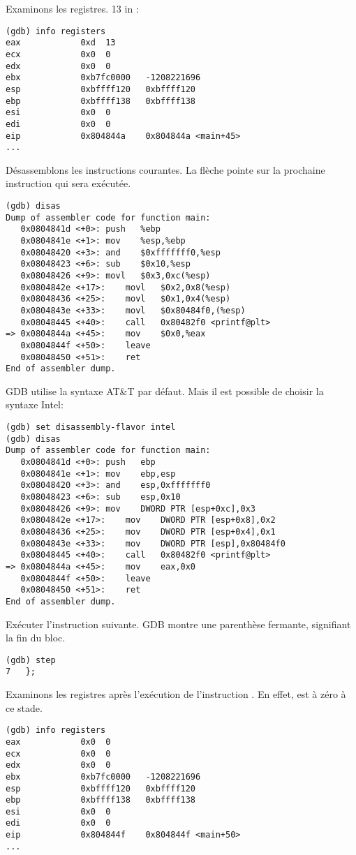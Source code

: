 Examinons les registres.
13 in \EAX:

\begin{lstlisting}
(gdb) info registers
eax            0xd	13
ecx            0x0	0
edx            0x0	0
ebx            0xb7fc0000	-1208221696
esp            0xbffff120	0xbffff120
ebp            0xbffff138	0xbffff138
esi            0x0	0
edi            0x0	0
eip            0x804844a	0x804844a <main+45>
...
\end{lstlisting}

Désassemblons les instructions courantes.
La flèche pointe sur la prochaine instruction qui sera exécutée.

\begin{lstlisting}[style=customasmx86]
(gdb) disas
Dump of assembler code for function main:
   0x0804841d <+0>:	push   %ebp
   0x0804841e <+1>:	mov    %esp,%ebp
   0x08048420 <+3>:	and    $0xfffffff0,%esp
   0x08048423 <+6>:	sub    $0x10,%esp
   0x08048426 <+9>:	movl   $0x3,0xc(%esp)
   0x0804842e <+17>:	movl   $0x2,0x8(%esp)
   0x08048436 <+25>:	movl   $0x1,0x4(%esp)
   0x0804843e <+33>:	movl   $0x80484f0,(%esp)
   0x08048445 <+40>:	call   0x80482f0 <printf@plt>
=> 0x0804844a <+45>:	mov    $0x0,%eax
   0x0804844f <+50>:	leave  
   0x08048450 <+51>:	ret    
End of assembler dump.
\end{lstlisting}

\ac{GDB} utilise la syntaxe AT\&T par défaut.
Mais il est possible de choisir la syntaxe Intel:

\begin{lstlisting}[style=customasmx86]
(gdb) set disassembly-flavor intel
(gdb) disas
Dump of assembler code for function main:
   0x0804841d <+0>:	push   ebp
   0x0804841e <+1>:	mov    ebp,esp
   0x08048420 <+3>:	and    esp,0xfffffff0
   0x08048423 <+6>:	sub    esp,0x10
   0x08048426 <+9>:	mov    DWORD PTR [esp+0xc],0x3
   0x0804842e <+17>:	mov    DWORD PTR [esp+0x8],0x2
   0x08048436 <+25>:	mov    DWORD PTR [esp+0x4],0x1
   0x0804843e <+33>:	mov    DWORD PTR [esp],0x80484f0
   0x08048445 <+40>:	call   0x80482f0 <printf@plt>
=> 0x0804844a <+45>:	mov    eax,0x0
   0x0804844f <+50>:	leave  
   0x08048450 <+51>:	ret    
End of assembler dump.
\end{lstlisting}

Exécuter l'instruction suivante.
\ac{GDB} montre une parenthèse fermante, signifiant la fin du bloc.

\begin{lstlisting}
(gdb) step
7	};
\end{lstlisting}

Examinons les registres après l'exécution de l'instruction .
En effet, \EAX est à zéro à ce stade.

\begin{lstlisting}
(gdb) info registers
eax            0x0	0
ecx            0x0	0
edx            0x0	0
ebx            0xb7fc0000	-1208221696
esp            0xbffff120	0xbffff120
ebp            0xbffff138	0xbffff138
esi            0x0	0
edi            0x0	0
eip            0x804844f	0x804844f <main+50>
...
\end{lstlisting}

